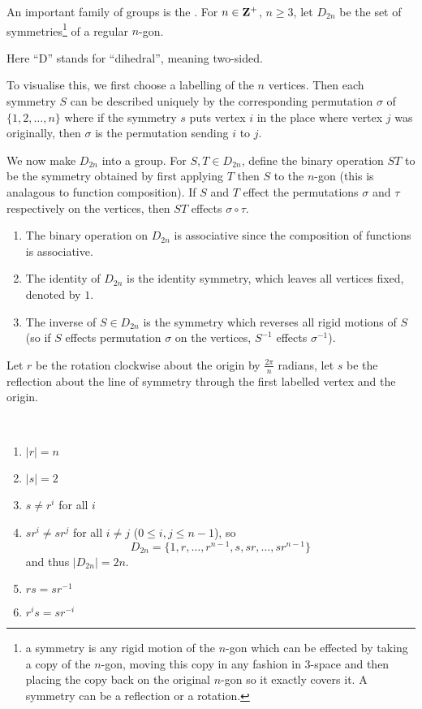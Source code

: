 \begin{example}
An important family of groups is the . For $n\in\mathbf Z^+$, $n\ge3$, let $D_{2n}$ be the set of symmetries\footnote{a symmetry is any rigid motion of the $n$-gon which can be effected by taking a copy of the $n$-gon, moving this copy in any fashion in $3$-space and then placing the copy back on the original $n$-gon so it exactly covers it. A symmetry can be a reflection or a rotation.} of a regular $n$-gon.

\begin{remark}
Here ``D'' stands for ``dihedral'', meaning two-sided.
\end{remark}

To visualise this, we first choose a labelling of the $n$ vertices. Then each symmetry $S$ can be described uniquely by the corresponding permutation $\sigma$ of $\{1,2,\dots,n\}$ where if the symmetry $s$ puts vertex $i$ in the place where vertex $j$ was originally, then $\sigma$ is the permutation sending $i$ to $j$.

We now make $D_{2n}$ into a group. For $S,T\in D_{2n}$, define the binary operation $ST$ to be the symmetry obtained by first applying $T$ then $S$ to the $n$-gon (this is analagous to function composition). If $S$ and $T$ effect the permutations $\sigma$ and $\tau$ respectively on the vertices, then $ST$ effects $\sigma\circ\tau$.

\begin{enumerate}[label=(\roman*)]
\item The binary operation on $D_{2n}$ is associative since the composition of functions is associative.
\item The identity of $D_{2n}$ is the identity symmetry, which leaves all vertices fixed, denoted by $1$.
\item The inverse of $S\in D_{2n}$ is the symmetry which reverses all rigid motions of $S$ (so if $S$ effects permutation $\sigma$ on the vertices, $S^{-1}$ effects $\sigma^{-1}$).
\end{enumerate}

Let $r$ be the rotation clockwise about the origin by $\frac{2\pi}{n}$ radians, let $s$ be the reflection about the line of symmetry through the first labelled vertex and the origin.

\begin{proposition*} \
\begin{enumerate}[label=(\roman*)]
\item $|r|=n$
\item $|s|=2$
\item $s\neq r^i$ for all $i$
\item $sr^i\neq sr^j$ for all $i\neq j$ ($0\le i,j\le n-1$), so
\[D_{2n}=\{1,r,\dots,r^{n-1},s,sr,\dots,sr^{n-1}\}\]
and thus $|D_{2n}|=2n$.
\item $rs=sr^{-1}$
\item $r^is=sr^{-i}$
\end{enumerate}
\end{proposition*}


\end{example}
